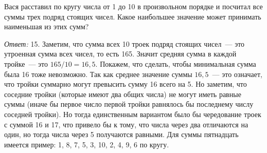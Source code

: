 \problem
Вася расставил по кругу числа от 1 до 10 в произвольном порядке и посчитал все
суммы трех подряд стоящих чисел.
Какое наибольшее значение может принимать наименьшая из этих сумм?

\solution
\emph{Ответ:} 15.
Заметим, что сумма всех 10 троек подряд стоящих чисел~--- это утроенная сумма
всех чисел, то есть 165.
Значит средняя сумма в каждой тройке~--- это $165 / 10 = 16{,}5$.
Покажем, что сделать, чтобы минимальная сумма была 16 тоже невозможно.
Так как среднее значение суммы $16{,}5$~--- это означает, что тройки суммарно
могут превысить сумму 16 всего на 5.
Но заметим, что соседние тройки (которые имеют два общих числа) не могут иметь
равные суммы (иначе бы первое число первой тройки равнялось бы последнему
числу соседней тройки).
Но тогда единственным вариантом было бы чередование троек с суммой 16 и 17,
что привело бы к тому, что числа через два отличаются на один, но тогда числа
через 5 получаются равными.
Для суммы пятнадцать имеется пример: 1, 8, 7, 5, 3, 10, 2, 4, 9, 6 по кругу.

\endproblem

